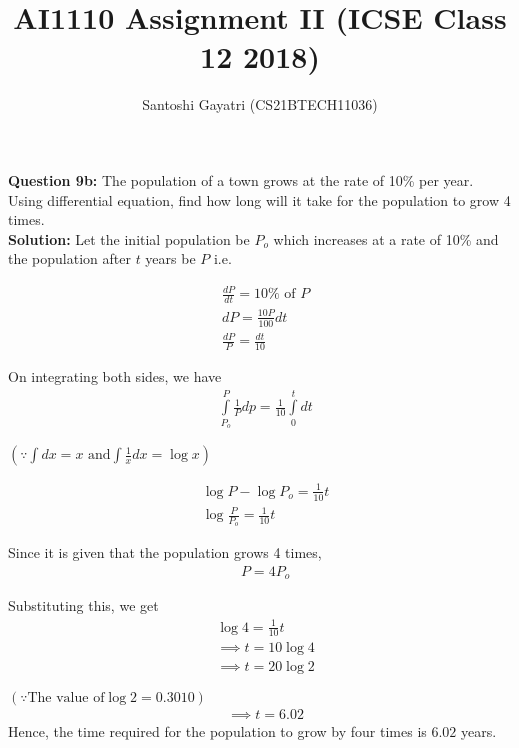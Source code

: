 \documentclass[journal,12pt,twocolumn]{IEEEtran}
\title{AI1110 Assignment II (ICSE Class 12 2018)}
\author{Santoshi Gayatri (CS21BTECH11036)}
\providecommand{\brak}[1]{\ensuremath{\left(#1\right)}}
\begin{document}
\maketitle

\textbf {Question 9b:}
The population of a town grows at the rate of 10\% per year. Using differential equation, find how long will it take for the population to grow 4 times.\\

\textbf{Solution:}
Let the initial population be $P_o$ which increases at a rate of 10\% and the population after $t$ years be $P$ i.e.

\begin{align}
& {\displaystyle \frac{dP}{dt} = 10\% \mbox{ of } P}\\[6pt]
& {dP =\displaystyle \frac{10P}{100}dt }\\[10pt]
& {\displaystyle \frac{dP}{P} = \frac{dt}{10}}
\end{align}

On integrating both sides, we have 
\begin{align}
& {\displaystyle { \int\limits_{P_o}^{P} \frac{1}{P} dp = \frac {1}{10} \int\limits_{0}^{t}dt}}
\end{align}


$ \brak{\because \int dx = x  \text{ and} \displaystyle\int \frac{1}{x}dx = \log x } $


\begin{align}
& {\log P - \log P_o = \frac{1}{10}t }\\
&{ \log \frac{P}{P_o} = \frac{1}{10}t }
\end{align}

Since it is given that the population grows 4 times, 
\begin{align}
&{P = 4P_o}
\end{align}

Substituting this, we get
\begin{align}
& {\log 4 =\displaystyle \frac {1}{10}t}\\[8pt]
& {\implies t= 10 \log 4 }\\[8pt]
& {\implies t = 20\log 2 }
\end{align}

$ \brak{\because \text{The value of} \log 2 = 0.3010 } $\\

\begin{align}
& {\implies t = 6.02} 
\end{align}
Hence, the time required for the population to grow by four times is \underline{$6.02$} years.
\end{document}
